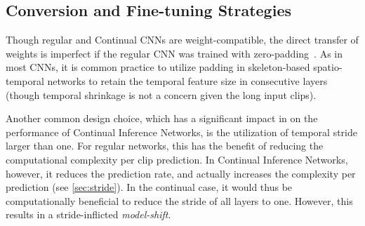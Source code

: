\documentclass[journal]{IEEEtran}
\theoremstyle{definition}
\begin{document}
\subsection{Conversion and Fine-tuning Strategies}\label{sec:ft-strategies}
Though regular and Continual CNNs are weight-compatible, the direct transfer of weights is imperfect if the regular CNN was trained with zero-padding~\cite{hedegaard2021continual}.
As in most CNNs, it is common practice to utilize padding in skeleton-based spatio-temporal networks to retain the temporal feature size in consecutive layers (though temporal shrinkage is not a concern given the long input clips).

Another common design choice, which has a significant impact in on the performance of Continual Inference Networks, is the utilization of temporal stride larger than one. 
For regular networks, this has the benefit of reducing the computational complexity per clip prediction. 
In Continual Inference Networks, however, it reduces the prediction rate, and actually increases the complexity per prediction (see \cref{sec:stride}).
In the continual case, it would thus be computationally beneficial to reduce the stride of all layers to one. However, this results in a stride-inflicted \textit{model-shift}.
\end{document}
